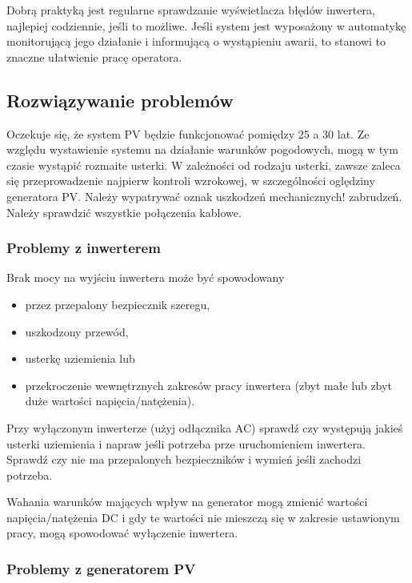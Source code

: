 \documentclass[12pt,a4paper]{article}
\begin{document}
 

Dobrą praktyką jest regularne sprawdzanie wyświetlacza błędów inwertera, 
najlepiej codziennie, jeśli to możliwe. Jeśli system jest wyposażony w 
automatykę monitorującą jego działanie i informującą o wystąpieniu 
awarii, to stanowi to znaczne ułatwienie pracę operatora. 

 

\subsection{Rozwiązywanie problemów}
  

Oczekuje się, że system PV będzie funkcjonować pomiędzy 25 a 30 lat. Ze 
względu wystawienie systemu na działanie warunków pogodowych, mogą w tym 
czasie wystąpić rozmaite usterki. W zależności od rodzaju usterki, 
zawsze zaleca się przeprowadzenie najpierw kontroli wzrokowej, w 
szczególności oględziny generatora PV. Należy wypatrywać oznak uszkodzeń 
mechanicznych! zabrudzeń. Należy sprawdzić wszystkie połączenia kablowe. 


 

\subsubsection{Problemy z inwerterem}
 

Brak mocy na wyjściu inwertera może być spowodowany 

\begin{itemize}
\item przez przepalony bezpiecznik szeregu, 
\item uszkodzony przewód, 
\item usterkę uziemienia lub 
\item przekroczenie wewnętrznych zakresów pracy inwertera (zbyt małe lub 
zbyt duże wartości napięcia/natężenia). 
\end{itemize}

Przy wyłączonym inwerterze (użyj odłącznika AC) sprawdź czy występują 
jakieś usterki uziemienia i napraw jeśli potrzeba prze uruchomieniem 
inwertera. Sprawdź czy nie ma przepalonych bezpieczników i wymień jeśli 
zachodzi potrzeba. 

Wahania warunków mających wpływ na generator mogą zmienić wartości 
napięcia/natężenia DC i gdy te wartości nie mieszczą się w zakresie 
ustawionym pracy, mogą spowodować wyłączenie inwertera. 

 

\subsubsection{Problemy z generatorem PV}
\end{document}
